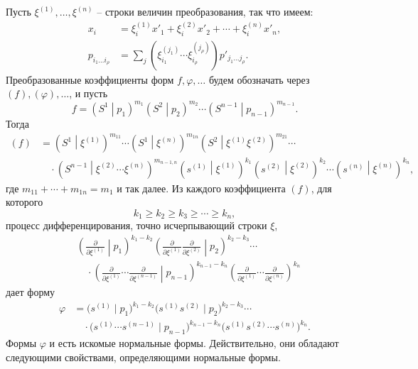 \documentclass[11pt]{article}
\newcommand{\pair}[2]{\left(#1\middle|#2\right)}
\begin{document}
Пусть $\xi^{(1)},\ldots,\xi^{(n)}$ -- строки величин преобразования, так что имеем:
\begin{equation}
\begin{aligned}
x_i&=\xi_i^{(1)}x'_1+\xi_i^{(2)}x'_2+\cdots+\xi_i^{(n)}x'_n,\\
p_{i_1\ldots i_\rho}&=\sum_j(\xi_{i_1}^{(j_1)}\cdots \xi_{i_\rho}^{(j_\rho)})p'_{j_1\ldots j_\rho}.
\end{aligned}
\tag{47}
\end{equation}
Преобразованные коэффициенты форм $f,\varphi,\ldots$ будем обозначать через $(f),(\varphi),\ldots$, и пусть
\[
 f=\pair{S^1}{p_1}^{m_1}\pair{S^2}{p_2}^{m_2}\cdots\pair{S^{n-1}}{p_{n-1}}^{m_{n-1}}.
\]
Тогда
\begin{equation}
\begin{aligned}
(f)&=\pair{S^1}{\xi^{(1)}}^{m_{11}}\cdots
\pair{S^1}{\xi^{(n)}}^{m_{1n}}
\pair{S^2}{\xi^{(1)}\xi^{(2)}}^{m_{21}}\cdots\\
&\quad\cdot
\pair{S^{n-1}}{\xi^{(2)}\cdots\xi^{(n)}}^{m_{n-1,n}}
\pair{s^{(1)}}{\xi^{(1)}}^{k_1}
\pair{s^{(2)}}{\xi^{(2)}}^{k_2}\cdots
\pair{s^{(n)}}{\xi^{(n)}}^{k_n},
\end{aligned}
\tag{48}
\end{equation}
где $m_{11}+\cdots+m_{1n}=m_1$ и так далее. Из каждого коэффициента $(f)$, для которого
\begin{equation}
 k_1\ge k_2\ge k_3\ge\cdots\ge k_n,
\tag{49}
\end{equation}
процесс дифференцирования, точно исчерпывающий строки $\xi$,
\begin{equation}
\begin{aligned}
&\left(\frac{\partial}{\partial\xi^{(1)}}\middle|p_1\right)^{k_1-k_2}
\left(\frac{\partial}{\partial\xi^{(1)}}\frac{\partial}{\partial\xi^{(2)}}\middle|p_2\right)^{k_2-k_3}\cdots\\
&\quad\cdot
\left(\frac{\partial}{\partial\xi^{(1)}}\cdots\frac{\partial}{\partial\xi^{(n-1)}}\middle|p_{n-1}\right)^{k_{n-1}-k_n}
\left(\frac{\partial}{\partial\xi^{(1)}}\cdots\frac{\partial}{\partial\xi^{(n)}}\right)^{k_n}
\end{aligned}
\tag{50}
\end{equation}
дает форму
\begin{equation}
\begin{aligned}
 \varphi&=\bigl(s^{(1)}\mid p_1\bigr)^{k_1-k_2}
 \bigl(s^{(1)}s^{(2)}\mid p_2\bigr)^{k_2-k_3}\cdots\\
 &\quad\cdot
 \bigl(s^{(1)}\cdots s^{(n-1)}\mid p_{n-1}\bigr)^{k_{n-1}-k_n}
 \bigl(s^{(1)}s^{(2)}\cdots s^{(n)}\bigr)^{k_n}.
\end{aligned}
\tag{51}
\end{equation}
Формы $\varphi$ и есть искомые нормальные формы. Действительно, они обладают следующими свойствами, определяющими нормальные формы.
\end{document}
